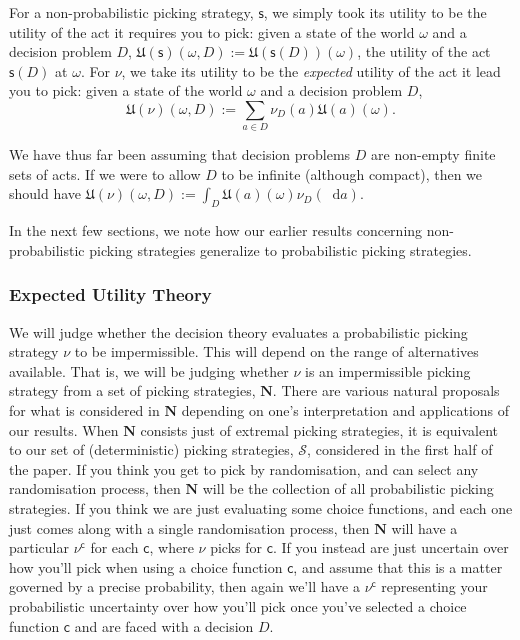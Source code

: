 \documentclass[a4paper]{article}
\newcommand\N{\mathbf{N}}
\renewcommand\S{\mathcal{S}}
\newcommand\s{\mathsf{s}}
\renewcommand\c{\mathsf{c}} %
\newcommand\Exp{\mathsf{Exp}}
\newcommand\EU{\mathrm{EU}}
\newcommand\U{\mathfrak{U}} %
\newcommand{\todoinfo}[2][]{\todo[backgroundcolor=orange!80,bordercolor=black,linecolor=gray!80, #1,inline,caption={}]{#2}}
\renewcommand{\color}[1]{}
\newenvironment{colored}[1]{\leavevmode\color{#1}}{}
\newcommand*\diff{\mathop{}\!\mathrm{d}}
\newenvironment{CCM rewritten}
{\begingroup\color{blue}} %
{\endgroup}              %
\begin{document}
For a non-probabilistic picking strategy, $\s$, we simply took its utility to be the utility of the act it requires you to pick: given a state of the world $\omega$ and a decision problem $D$, $\U(\s)(\omega,D):=\U(\s(D))(\omega)$, the utility of the act $\s(D)$ at $\omega$. For $\nu$, we take its utility to be the \textit{expected} utility of the act it lead you to pick: given a state of the world $\omega$ and a decision problem $D$, $$\U(\nu)(\omega,D):=\sum_{a \in D} \nu_D(a)\U(a)(\omega).$$
\begin{comment}
\begin{colored}{violet}
	If we are allowing $D$ to be infinite (although compact), we should in fact take an integral, $\U(\nu)(\omega,D):=\int_{a \in D} \U(a)(\omega)\,\nu_D(\diff a).$\todo{should we explicitly talk about finitely additive integrals?}
\end{colored}
\end{comment}


We have thus far been assuming that decision problems $D$ are non-empty finite sets of acts. If we were to allow $D$ to be infinite (although compact), then we should have $\U(\nu)(\omega,D):=\int_{D} \U(a)(\omega) \nu_D(\diff a)$.

In the next few sections, we note how our earlier results concerning non-probabilistic picking strategies generalize to probabilistic picking strategies.
\subsubsection{Expected Utility Theory}
{\color{violet}We will judge whether the decision theory evaluates a probabilistic picking strategy $\nu$ to be impermissible. This will depend on the range of alternatives available. That is, we will be judging whether $\nu$ is an impermissible picking strategy from a set of picking strategies, $\N$. }
There are various natural proposals for what is considered in $\N$ depending on one's interpretation and applications of our results. 
When $\N$ consists just of extremal picking strategies, it is equivalent to our set of (deterministic) picking strategies, $\S$, considered in the first half of the paper. 
If you think you get to pick by randomisation, and can select any randomisation process, then $\N$ will be the collection of all probabilistic picking strategies.
If you think we are just evaluating some choice functions, and each one just comes along with a single randomisation process, then $\N$ will have a particular $\nu^\c$ for each $\c$, where $\nu$ picks for $\c$. 
If you instead are just uncertain over how you'll pick when using a choice function $\c$, and assume that this is a matter governed by a precise probability, then again we'll have a $\nu^\c$ representing your probabilistic uncertainty over how you'll pick once you've selected a choice function $\c$ and are faced with a decision $D$.
\end{document}
